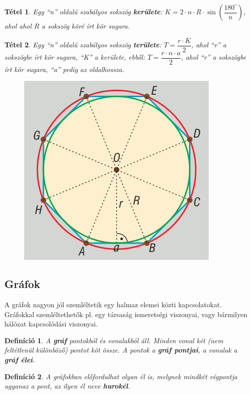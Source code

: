 \documentclass[12pt,a4paper]{article}
\newtheorem{theorem}{Tétel} [section]
\newtheorem{definition}{Definíció} [section]
\begin{document}
\begin{theorem}
Egy ``n'' oldalú szabályos sokszög \textbf{kerülete}: $K=2\cdot n \cdot R \cdot \sin \left(\dfrac{180^\circ}{n} \right)$, ahol ahol $R$ a sokszög köré írt kör sugara.
\end{theorem}

\begin{theorem}
Egy ``n'' oldalú szabályos sokszög \textbf{területe}: $T=\dfrac{r\cdot K}{2}$, ahol  ``r'' a sokszögbe írt kör sugara, ``K'' a kerülete, ebből: $T=\dfrac{r\cdot n \cdot a}{2}$, ahol ``r'' a sokszögbe írt kör sugara, ``a'' pedig az oldalhossza.
\end{theorem}

\begin{figure}[h]
\centering
\includegraphics[scale=0.3]{geometry/sokszog}
\end{figure}

\subsection{Gráfok}
A gráfok nagyon jól szemléltetik egy halmaz elemei közti kapcsolatokat. Gráfokkal szemléltethetők pl. egy társaság ismeretségi viszonyai, vagy bármilyen hálózat kapcsolódási viszonyai.

\begin{definition}
A \textbf{gráf} pontokból és vonalakból áll. Minden vonal két (nem feltétlenül különböző) pontot köt össze. A pontok a \textbf{gráf pontjai}, a vonalak a \textbf{gráf élei}.
\end{definition}

\begin{definition}
A gráfokban előfordulhat olyan él is, melynek mindkét végpontja ugyanaz a pont, az ilyen él neve \textbf{hurokél}.
\end{definition}
\end{document}
